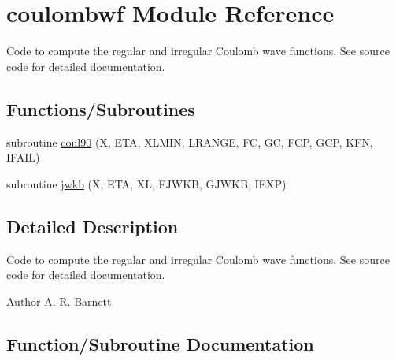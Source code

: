 \hypertarget{namespacecoulombwf}{}\section{coulombwf Module Reference}
\label{namespacecoulombwf}


Code to compute the regular and irregular Coulomb wave functions. See source code for detailed documentation.  


\subsection*{Functions/\+Subroutines}
\begin{DoxyCompactItemize}
\item 
subroutine \hyperlink{namespacecoulombwf_acb318117b6a1f36c6bf65b196f8ea77a}{coul90} (X, E\+TA, X\+L\+M\+IN, L\+R\+A\+N\+GE, FC, GC, F\+CP, G\+CP, K\+FN, I\+F\+A\+IL)
\item 
subroutine \hyperlink{namespacecoulombwf_ae2567eabc2798a95c720b07a68e61bba}{jwkb} (X, E\+TA, XL, F\+J\+W\+KB, G\+J\+W\+KB, I\+E\+XP)
\end{DoxyCompactItemize}


\subsection{Detailed Description}
Code to compute the regular and irregular Coulomb wave functions. See source code for detailed documentation. 

\begin{DoxyAuthor}{Author}
A. R. Barnett 
\end{DoxyAuthor}


\subsection{Function/\+Subroutine Documentation}
\mbox{\label{namespacecoulombwf_acb318117b6a1f36c6bf65b196f8ea77a}} 
